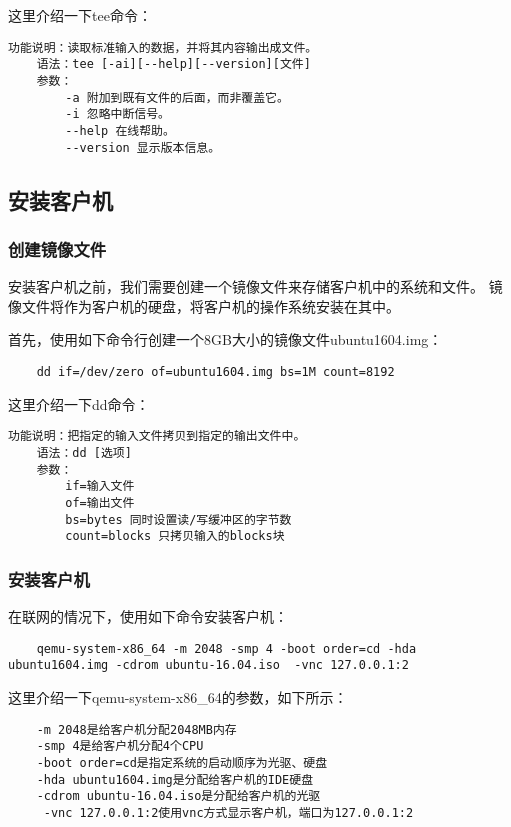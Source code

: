 \documentclass[a4paper,left=2.5cm,right=2.5cm,11pt]{article}
\begin{document}
	这里介绍一下tee命令：
	\begin{lstlisting}[numberstyle = \color{white}]
	功能说明：读取标准输入的数据，并将其内容输出成文件。
	语法：tee [-ai][--help][--version][文件]
	参数：
		-a 附加到既有文件的后面，而非覆盖它。
		-i 忽略中断信号。
		--help 在线帮助。
		--version 显示版本信息。
	\end{lstlisting}

\subsection{安装客户机}
\subsubsection{创建镜像文件}
	安装客户机之前，我们需要创建一个镜像文件来存储客户机中的系统和文件。
	镜像文件将作为客户机的硬盘，将客户机的操作系统安装在其中。\par
	
	首先，使用如下命令行创建一个8GB大小的镜像文件ubuntu1604.img：
	\begin{lstlisting}
	dd if=/dev/zero of=ubuntu1604.img bs=1M count=8192
	\end{lstlisting}

	这里介绍一下dd命令：
	\begin{lstlisting}[numberstyle = \color{white}]
	功能说明：把指定的输入文件拷贝到指定的输出文件中。
	语法：dd [选项]
	参数：
		if=输入文件
		of=输出文件
		bs=bytes 同时设置读/写缓冲区的字节数
		count=blocks 只拷贝输入的blocks块
	\end{lstlisting}

\subsubsection{安装客户机}
	在联网的情况下，使用如下命令安装客户机：
	\begin{lstlisting}
	qemu-system-x86_64 -m 2048 -smp 4 -boot order=cd -hda ubuntu1604.img -cdrom ubuntu-16.04.iso  -vnc 127.0.0.1:2
	\end{lstlisting}

	这里介绍一下qemu-system-x86\_64的参数，如下所示：
	\begin{lstlisting}
	-m 2048是给客户机分配2048MB内存
	-smp 4是给客户机分配4个CPU
	-boot order=cd是指定系统的启动顺序为光驱、硬盘
	-hda ubuntu1604.img是分配给客户机的IDE硬盘
	-cdrom ubuntu-16.04.iso是分配给客户机的光驱
	 -vnc 127.0.0.1:2使用vnc方式显示客户机，端口为127.0.0.1:2
	\end{lstlisting}
\end{document}
